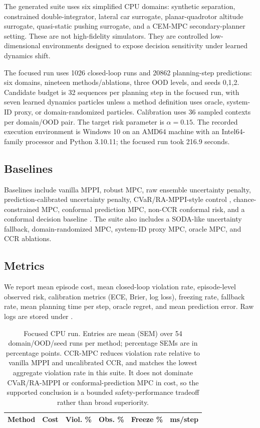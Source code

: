 \documentclass[11pt]{article}
\begin{document}
The generated suite uses six simplified CPU domains: synthetic separation, constrained double-integrator, lateral car surrogate, planar-quadrotor altitude surrogate, quasi-static pushing surrogate, and a CEM-MPC secondary-planner setting. These are not high-fidelity simulators. They are controlled low-dimensional environments designed to expose decision sensitivity under learned dynamics shift.

The focused run uses 1026 closed-loop runs and 20862 planning-step predictions: six domains, nineteen methods/ablations, three OOD levels, and seeds 0,1,2. Candidate budget is 32 sequences per planning step in the focused run, with seven learned dynamics particles unless a method definition uses oracle, system-ID proxy, or domain-randomized particles. Calibration uses 36 sampled contexts per domain/OOD pair. The target risk parameter is $\alpha=0.15$. The recorded execution environment is Windows 10 on an AMD64 machine with an Intel64-family processor and Python 3.10.11; the focused run took 216.9 seconds.

\subsection{Baselines}

Baselines include vanilla MPPI, robust MPC, raw ensemble uncertainty penalty, prediction-calibrated uncertainty penalty, CVaR/RA-MPPI-style control \citep{yin2023ramppi}, chance-constrained MPC, conformal prediction MPC, non-CCR conformal risk, and a conformal decision baseline \citep{angelopoulos2024conformalrisk,lekeufack2023conformaldecision}. The suite also includes a SODA-like uncertainty fallback, domain-randomized MPC, system-ID proxy MPC, oracle MPC, and CCR ablations.

\subsection{Metrics}

We report mean episode cost, mean closed-loop violation rate, episode-level observed risk, calibration metrics (ECE, Brier, log loss), freezing rate, fallback rate, mean planning time per step, oracle regret, and mean prediction error. Raw logs are stored under .

\begin{table}[t]
\centering
\scriptsize
\begin{tabular}{lccccc}
\toprule
Method & Cost & Viol. \% & Obs. \% & Freeze \% & ms/step \\
\midrule

\end{tabular}
\caption{Focused CPU run. Entries are mean (SEM) over 54 domain/OOD/seed runs per method; percentage SEMs are in percentage points. CCR-MPC reduces violation rate relative to vanilla MPPI and uncalibrated CCR, and matches the lowest aggregate violation rate in this suite. It does not dominate CVaR/RA-MPPI or conformal-prediction MPC in cost, so the supported conclusion is a bounded safety-performance tradeoff rather than broad superiority.}
\label{tab:main}
\end{table}
\end{document}
